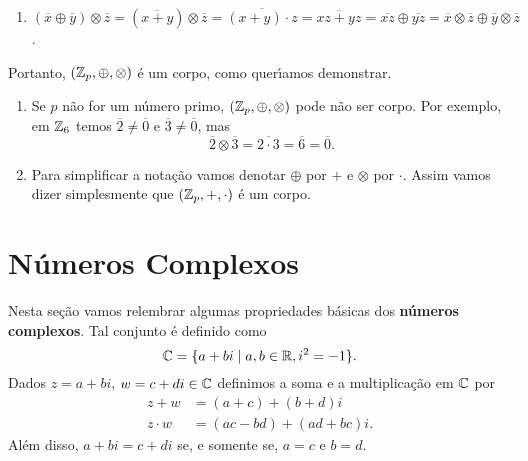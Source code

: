 \begin{prova}
\begin{enumerate}[label={\roman*})]
\begin{align*}
			&\overline{x} \otimes \overline{y} + \overline{p} \otimes \overline{z} = \overline{1}\\
			&\overline{x} \otimes \overline{y} = \overline{1}
		\end{align*}
		uma vez que $\overline{p} = \overline{0}$. Como $\overline{y}$ \'e obtido pelo resto da divis\~ao inteira de $y$ por $p$, ent\~ao 
		$\overline{y} \in \z_p$. Observe que $y \ne 0$ pois $p \ge 2$ e $y \ne p$ pois sen\~ao $(x + z)p = 1$ o que \'e imposs{\'\i}vel uma vez que $p \ge 2$. Logo $\overline{y} \ne \overline{0}$ e assim todo elemento $\overline{x} \in \z_p$ possui inverso multiplicativo.
		\item $(\overline{x} \oplus \overline{y}) \otimes \overline{z}= (\overline{x + y}) \otimes \overline{z} = \overline{(x + y) \cdot z} = \overline{xz + yz} = \overline{xz} \oplus \overline{yz} = \overline{x} \otimes \overline{z} \oplus \overline{y} \otimes \overline{z}$.
	\end{enumerate}
	Portanto, $(\mathbb{Z}_p, \oplus, \otimes)$ \'e um corpo, como quer{\'\i}amos demonstrar.
\end{prova}

\begin{observacao}
\begin{enumerate}
	\item Se $p$ n\~ao for um n\'umero primo, $(\mathbb{Z}_p, \oplus, \otimes)$ pode n\~ao ser corpo. Por exemplo, em $\mathbb{Z}_6$ temos $\overline{2} \ne \overline{0}$ e $\overline{3} \ne \overline{0}$, mas
	\[
		\overline{2}\otimes \overline{3} = \overline{2\cdot 3} = \overline{6} = \overline{0}.
	\]
	\item Para simplificar a nota\c{c}\~ao vamos denotar $\oplus$ por $+$ e $\otimes$ por $\cdot$. Assim vamos dizer simplesmente que $(\mathbb{Z}_p, +, \cdot)$ \'e um corpo.
\end{enumerate}
\end{observacao}

\section{N\'umeros Complexos}
Nesta se\c{c}\~ao vamos relembrar algumas propriedades b\'asicas dos \textbf{n\'umeros complexos}. Tal conjunto \'e definido como
\[
	\mathbb{C} = \{a + bi \mid a, b \in \mathbb{R}, i^2 = -1\}.
\]
Dados $z = a + bi$, $w = c + di \in \mathbb{C}$ definimos a soma e a multiplica\c{c}\~ao em $\mathbb{C}$ por
\begin{align*}
	z + w &= (a + c) + (b + d)i\\
	z\cdot w &= (ac - bd) + (ad + bc)i.
\end{align*}
Al\'em disso, $a + bi = c + di$ se, e somente se, $a = c$ e $b = d$.

